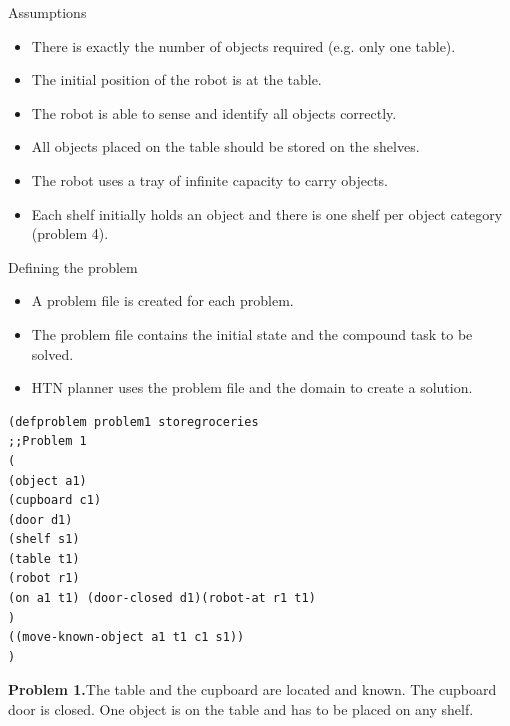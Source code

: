 \documentclass{beamer}
\begin{document}
	\begin{frame}{Assumptions}
			
		
			\begin{itemize}
				\item There is exactly the number of objects required (e.g. only one table).
				\item The initial position of the robot is at the table.
				\item The robot is able to sense and identify all objects correctly.
				\item All objects placed on the table should be stored on the shelves.
				\item The robot uses a tray of infinite capacity to carry objects.
				\item Each shelf initially holds an object and there is one shelf per object category (problem 4).
				
			\end{itemize}

	\end{frame}
	
	
	\begin{frame}{Defining the problem}
		\begin{itemize}
			\item A problem file is created for each problem.
			\item The problem file contains the initial state and the compound task to be solved.
			\item HTN planner uses the problem file and the domain to create a solution.
		\end{itemize}
	\end{frame}
	
	
		
\begin{lstlisting}
(defproblem problem1 storegroceries
;;Problem 1
(
(object a1)
(cupboard c1)
(door d1)
(shelf s1)
(table t1)
(robot r1)
(on a1 t1) (door-closed d1)(robot-at r1 t1)
)
((move-known-object a1 t1 c1 s1))
)
\end{lstlisting}
	
		\textbf{Problem 1.}The table and the cupboard are located and known. The cupboard door is closed. One object is on the table and has to be placed on any shelf. \vspace{7cm}
		
\end{document}
